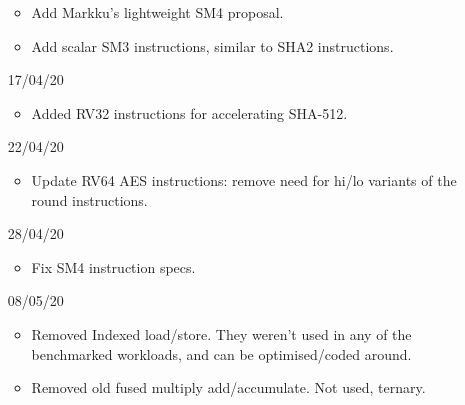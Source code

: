 \begin{itemize}
\begin{itemize}
    \item Add Markku's lightweight SM4 proposal.
    \item Add scalar SM3 instructions, similar to SHA2 instructions.
\end{itemize}
\item[17/04/20] \begin{itemize}
    \item Added RV32 instructions for accelerating SHA-512.
\end{itemize}
\item[22/04/20] \begin{itemize}
    \item Update RV64 AES instructions: remove need for hi/lo variants of
          the round instructions.
\end{itemize}
\item[28/04/20] \begin{itemize}
    \item Fix SM4 instruction specs. 
\end{itemize}
\item[08/05/20] \begin{itemize}
    \item Removed Indexed load/store. They weren't used in any of the
          benchmarked workloads, and can be optimised/coded around.
    \item Removed old fused multiply add/accumulate. Not used, ternary.
\end{itemize}
\end{itemize}
